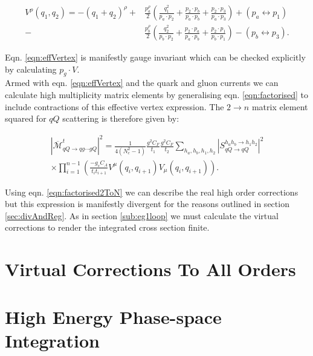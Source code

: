 		\begin{align}
			V^\rho(q_1, q_2) = -(q_1 + q_2)^\rho +
			&\frac{p_a^\rho}{2}\left(\frac{q^2_1}{p_a\cdot p_2} + \frac{p_2 \cdot p_b}{p_a \cdot p_b} + \frac{p_2 \cdot p_3}{p_a \cdot p_3}\right) + (p_a\leftrightarrow p_1) \\
			- &\frac{p_b^\rho}{2}\left(\frac{q^2_2}{p_b\cdot p_2} + \frac{p_2 \cdot p_a}{p_a \cdot p_b} + \frac{p_2 \cdot p_1}{p_b \cdot p_1}\right) - (p_b\leftrightarrow p_3).
			\label{eqn:effVertex}
		\end{align}

		Eqn. \eqref{eqn:effVertex} is manifestly gauge invariant which can be checked explicitly by
		calculating $p_g\cdot V$.\\Armed with eqn. \eqref{eqn:effVertex} and the quark and gluon
		currents we can calculate high multiplicity matrix elements by generalising eqn.
		\eqref{eqn:factorised} to include contractions of this effective vertex expression.  The
		$2\rightarrow n$ matrix element squared for $qQ$ scattering is therefore given by:

		\begin{align}
			|\overline{\mathcal{M}}^t_{qQ\rightarrow qg\cdots gQ}|^2 = \frac{1}{4(N_c^2-1)}
			\frac{g^2C_F}{t_1}\frac{g^2C_F}{t_2} \sum_{h_a, h_b, h_1, h_2}
			|S_{qQ\rightarrow qQ}^{h_ah_b\rightarrow h_1h_2}|^2\\
			\times\prod_{i=1}^{n-1}\left(\frac{-g_sC_A}{t_it_{i+1}}V^\mu(q_i, q_{i+1})V_\mu(q_i, q_{i+1})\right).
			\label{eqn:factorised2ToN}
		\end{align}

		Using eqn. \eqref{eqn:factorised2ToN} we can describe the real high order corrections
		but this expression is manifestly divergent for the reasons outlined in section
		\ref{sec:divAndReg}.  As in section \ref{sub:eg1loop} we must calculate the virtual
		corrections to render the integrated cross section finite.

	\section{Virtual Corrections To All Orders}
		\label{sub:effective_vertices_for_real_emissions}

	\section{High Energy Phase-space Integration}
		\label{sub:HEPhaseSpace}


